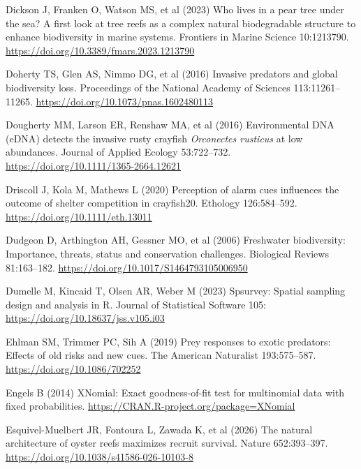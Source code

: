 \documentclass[
  12pt,
  a4paper,
  oneside]{scrbook}
\newlength{\cslhangindent}
\newenvironment{CSLReferences}[2] %
 {\begin{list}{}{%
  \setlength{\itemindent}{0pt}
  \setlength{\leftmargin}{0pt}
  \setlength{\parsep}{0pt}
  \ifodd #1
   \setlength{\leftmargin}{\cslhangindent}
   \setlength{\itemindent}{-1\cslhangindent}
  \fi
  \setlength{\itemsep}{#2\baselineskip}}}
 {\end{list}}
\renewenvironment{CSLReferences}[2]
   {\begin{list}{}{%
    \setlength{\itemindent}{0pt}
    \setlength{\leftmargin}{0pt}
    \setlength{\parsep}{0pt}
    \ifodd #1
     \setlength{\leftmargin}{\cslhangindent}
     \setlength{\itemindent}{-1\cslhangindent}
    \fi
    \setlength{\itemsep}{0.3\baselineskip}}}
   {\end{list}}%
\begin{document}
\begin{CSLReferences}{1}{1}
Dickson J, Franken O, Watson MS, et al (2023) Who lives in a pear tree
under the sea? A first look at tree reefs as a complex natural
biodegradable structure to enhance biodiversity in marine systems.
Frontiers in Marine Science 10:1213790.
\url{https://doi.org/10.3389/fmars.2023.1213790}

Doherty TS, Glen AS, Nimmo DG, et al (2016) Invasive predators and
global biodiversity loss. Proceedings of the National Academy of
Sciences 113:11261--11265. \url{https://doi.org/10.1073/pnas.1602480113}

Dougherty MM, Larson ER, Renshaw MA, et al (2016) Environmental {DNA}
({eDNA}) detects the invasive rusty crayfish {\emph{Orconectes
rusticus}} at low abundances. Journal of Applied Ecology 53:722--732.
\url{https://doi.org/10.1111/1365-2664.12621}

Driscoll J, Kola M, Mathews L (2020) Perception of alarm cues influences
the outcome of shelter competition in crayfish20. Ethology 126:584--592.
\url{https://doi.org/10.1111/eth.13011}

Dudgeon D, Arthington AH, Gessner MO, et al (2006) Freshwater
biodiversity: Importance, threats, status and conservation challenges.
Biological Reviews 81:163--182.
\url{https://doi.org/10.1017/S1464793105006950}

Dumelle M, Kincaid T, Olsen AR, Weber M (2023) Spsurvey: Spatial
sampling design and analysis in {R}. Journal of Statistical Software
105: \url{https://doi.org/10.18637/jss.v105.i03}

Ehlman SM, Trimmer PC, Sih A (2019) Prey responses to exotic predators:
Effects of old risks and new cues. The American Naturalist 193:575--587.
\url{https://doi.org/10.1086/702252}

Engels B (2014) {XNomial}: Exact goodness-of-fit test for multinomial
data with fixed probabilities.
\url{https://CRAN.R-project.org/package=XNomial}

Esquivel-Muelbert JR, Fontoura L, Zawada K, et al (2026) The natural
architecture of oyster reefs maximizes recruit survival. Nature
652:393--397. \url{https://doi.org/10.1038/s41586-026-10103-8}


\end{CSLReferences}
\end{document}
